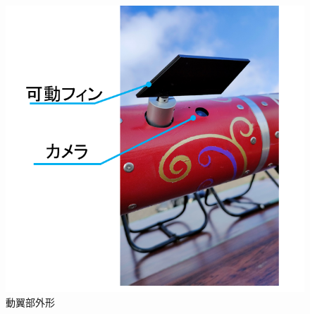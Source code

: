 \documentclass[a4paper,11pt,uplatex]{jsarticle}
\begin{document}
\begin{figure}[H]
	\centering
	\includegraphics[scale = 0.5]{pic_str/s_r_outer_2.png}
	\caption{動翼部外形}
	\label{s_r_outer}
\end{figure}
\end{document}
